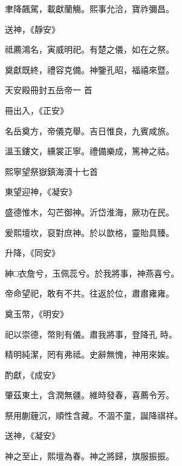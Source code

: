 \begin{pinyinscope}
 聿降飆駕，載獻蘭觴。熙事允洽，寶祚彌昌。



 送神，《靜安》



 祗薦鴻名，寅威明祀。有楚之儀，如在之祭。



 奠獻既終，禮容克備。神鑒孔昭，福禧來暨。



 天安殿冊封五岳帝一
 首



 冊出入，《正安》



 名岳奠方，帝儀克舉。吉日惟良，九賓咸旅。



 溫玉鏤文，纁裳正寧。禮備樂成，篤神之祜。



 熙寧望祭嶽鎮海瀆十七首



 東望迎神，《凝安》



 盛德惟木，勾芒御神。沂岱淮海，厥功在民。



 爰熙壇坎，裒對庶神。於以歆格，靈貽具臻。



 升降，《同安》



 紳□衣詹兮，玉佩蕊兮。於我將事，神燕喜兮。



 帝命望祀，敢有不共。往返於位，肅肅雍雍。



 奠玉幣，《明安》



 祀以崇德，幣則有儀。肅我將事，登降孔
 時。



 精明純潔，罔有弗祗。史辭無愧，神用來娭。



 酌獻，《成安》



 肇茲東土，含潤無疆。維時發春，喜薦令芳。



 祭用蒯薶沉，順性含藏。不涸不童，誕降祺祥。



 送神，《凝安》



 神之至止，熙壇為春。神之將歸，旗服振振。




\end{pinyinscope}
